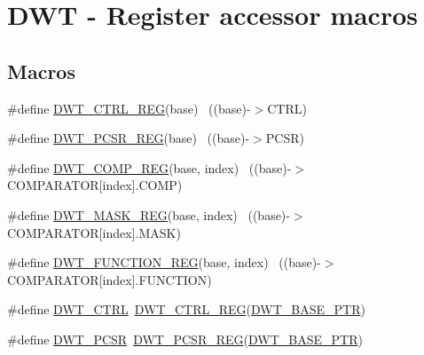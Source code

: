 \hypertarget{group___d_w_t___register___accessor___macros}{}\section{D\+WT -\/ Register accessor macros}
\label{group___d_w_t___register___accessor___macros}
\subsection*{Macros}
\begin{DoxyCompactItemize}
\item 
\#define \hyperlink{group___d_w_t___register___accessor___macros_ga805e8330d1aa986d534abe1eed2614df}{D\+W\+T\+\_\+\+C\+T\+R\+L\+\_\+\+R\+EG}(base)                                          ~((base)-\/$>$C\+T\+RL)
\item 
\#define \hyperlink{group___d_w_t___register___accessor___macros_ga19fcf102babeb34ec17bc96dd4d08e52}{D\+W\+T\+\_\+\+P\+C\+S\+R\+\_\+\+R\+EG}(base)                                          ~((base)-\/$>$P\+C\+SR)
\item 
\#define \hyperlink{group___d_w_t___register___accessor___macros_gad03eebac5bf5c3c3e461e156ba6e37ae}{D\+W\+T\+\_\+\+C\+O\+M\+P\+\_\+\+R\+EG}(base,  index)                              ~((base)-\/$>$C\+O\+M\+P\+A\+R\+A\+T\+OR\mbox{[}index\mbox{]}.C\+O\+MP)
\item 
\#define \hyperlink{group___d_w_t___register___accessor___macros_ga16461875f56f3b91ee27a53a9f4dbc78}{D\+W\+T\+\_\+\+M\+A\+S\+K\+\_\+\+R\+EG}(base,  index)                              ~((base)-\/$>$C\+O\+M\+P\+A\+R\+A\+T\+OR\mbox{[}index\mbox{]}.M\+A\+SK)
\item 
\#define \hyperlink{group___d_w_t___register___accessor___macros_gaedc0f311fdf85789a988b58375481265}{D\+W\+T\+\_\+\+F\+U\+N\+C\+T\+I\+O\+N\+\_\+\+R\+EG}(base,  index)                      ~((base)-\/$>$C\+O\+M\+P\+A\+R\+A\+T\+OR\mbox{[}index\mbox{]}.F\+U\+N\+C\+T\+I\+ON)
\item 
\#define \hyperlink{group___d_w_t___register___accessor___macros_ga90b9ebedff8635727698afd2fa84b90a}{D\+W\+T\+\_\+\+C\+T\+RL}~\hyperlink{group___d_w_t___register___accessor___macros_ga805e8330d1aa986d534abe1eed2614df}{D\+W\+T\+\_\+\+C\+T\+R\+L\+\_\+\+R\+EG}(\hyperlink{group___d_w_t___peripheral_ga3b46dfb2ea7946c6938028d879c82cb1}{D\+W\+T\+\_\+\+B\+A\+S\+E\+\_\+\+P\+TR})
\item 
\#define \hyperlink{group___d_w_t___register___accessor___macros_ga0c50769b8e0069fe1c5e06d1d356fad3}{D\+W\+T\+\_\+\+P\+C\+SR}~\hyperlink{group___d_w_t___register___accessor___macros_ga19fcf102babeb34ec17bc96dd4d08e52}{D\+W\+T\+\_\+\+P\+C\+S\+R\+\_\+\+R\+EG}(\hyperlink{group___d_w_t___peripheral_ga3b46dfb2ea7946c6938028d879c82cb1}{D\+W\+T\+\_\+\+B\+A\+S\+E\+\_\+\+P\+TR})

\end{DoxyCompactItemize}
